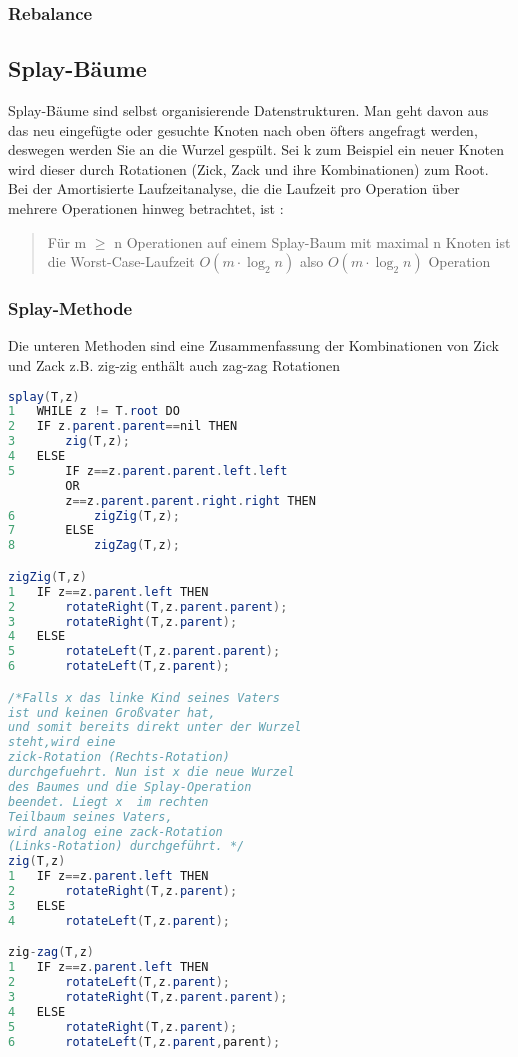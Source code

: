 \documentclass[jou,apacite]{apa6}
\begin{document}
\subsubsection{Rebalance}

\subsection{Splay-Bäume}
Splay-Bäume sind selbst organisierende Datenstrukturen. Man geht davon aus das neu eingefügte oder gesuchte Knoten nach oben öfters angefragt werden, deswegen werden Sie an die Wurzel gespült. Sei k zum Beispiel ein neuer Knoten wird dieser durch Rotationen (Zick, Zack und ihre Kombinationen) zum  Root.
Bei der Amortisierte Laufzeitanalyse, die die Laufzeit pro Operation über mehrere Operationen hinweg betrachtet, ist :
\begin{quote}
    Für m $\geq$ n Operationen auf einem Splay-Baum mit maximal n Knoten ist die Worst-Case-Laufzeit $O(m \cdot\log_2 n)$ also $O(m\cdot\log_2 n)$ Operation
\end{quote}
\subsubsection{Splay-Methode}
Die unteren Methoden sind eine Zusammenfassung der Kombinationen von Zick und Zack  z.B. zig-zig enthält auch zag-zag Rotationen
\begin{lstlisting}[language=java]
splay(T,z)
1   WHILE z != T.root DO
2   IF z.parent.parent==nil THEN
3       zig(T,z);
4   ELSE
5       IF z==z.parent.parent.left.left 
        OR 
        z==z.parent.parent.right.right THEN
6           zigZig(T,z);
7       ELSE
8           zigZag(T,z);

zigZig(T,z)
1   IF z==z.parent.left THEN
2       rotateRight(T,z.parent.parent);
3       rotateRight(T,z.parent);
4   ELSE
5       rotateLeft(T,z.parent.parent);
6       rotateLeft(T,z.parent);

/*Falls x das linke Kind seines Vaters 
ist und keinen Großvater hat,
und somit bereits direkt unter der Wurzel 
steht,wird eine 
zick-Rotation (Rechts-Rotation) 
durchgefuehrt. Nun ist x die neue Wurzel
des Baumes und die Splay-Operation
beendet. Liegt x  im rechten 
Teilbaum seines Vaters,
wird analog eine zack-Rotation 
(Links-Rotation) durchgeführt. */
zig(T,z)
1   IF z==z.parent.left THEN
2       rotateRight(T,z.parent);
3   ELSE
4       rotateLeft(T,z.parent);

zig-zag(T,z)
1   IF z==z.parent.left THEN
2       rotateLeft(T,z.parent);
3       rotateRight(T,z.parent.parent);
4   ELSE
5       rotateRight(T,z.parent);
6       rotateLeft(T,z.parent,parent);
\end{lstlisting}
\end{document}
